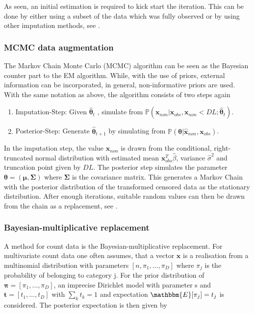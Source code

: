 As seen, an initial estimation is required to kick start the iteration. This can be done by either using a subset of the data which was fully observed or by using other imputation methods, see \textcite{Palarea-Albaladejo:2015}. 


\subsubsection{MCMC data augmentation}
\label{sec:MCMC data augmentation}

The Markov Chain Monte Carlo (MCMC) algorithm can be seen as the Bayesian counter part to the EM algorithm. While, with the use of priors, external information can be incorporated, in general, non-informative priors are used. With the same notation as above, the algorithm consists of two steps again

\begin{enumerate}
	\item Imputation-Step: Given $\hat{\bm{\theta}}_t$ , simulate from $\mathbb{P}(\bm{x}_{non}|\bm{x}_{obs},\bm{x}_{non} < DL; \hat{\bm{\theta}}_t)$.
	\item Posterior-Step: Generate $\hat{\bm{\theta}}_{t+1}$ by simulating from $\mathbb{P}(\bm{\theta}|\hat{\bm{x}}_{non},\bm{x}_{obs})$. 
\end{enumerate}

In the imputation step, the value $\hat{\bm{x}}_{non}$ is drawn from the conditional, right-truncated normal distribution with estimated mean $\bm{x}_{obs}^T\hat{\beta}$, variance $\hat{\sigma}^2$ and truncation point given by $DL$. The posterior step simulates the parameter $\bm{\theta}=(\bm{\mu},\bm{\Sigma})$ where $\bm{\Sigma}$ is the covariance matrix. This generates a Markov Chain with the posterior distribution of the transformed censored data as the stationary distribution. After enough iterations, suitable random values can then be drawn from the chain as a replacement, see \textcite{Palarea-Albaladejo:2015}. %


\subsubsection{Bayesian-multiplicative replacement}
\label{sec:Bayesian-multiplicative replacement}

A method for count data is the Bayesian-multiplicative replacement. For multivariate count data one often assumes, that a vector $\bm{x}$ is a realisation from a multinomial distribution with parameters $[n,\pi_1,\ldots,\pi_D]$ where $\pi_j$ is the probability of belonging to category j. For the prior distribution of $\bm{\pi}=[\pi_1,\ldots,\pi_D]$, an imprecise Dirichlet model with parameter s and $\bm{t}=[t_1,\ldots,t_D]$ with $\sum_k t_k=1$ and expectation $\mathbbm{E}[\pi_j]=t_j$ is considered. The posterior expectation is then given by 


